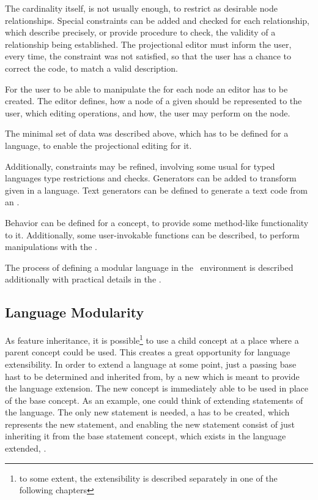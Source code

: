 The cardinality itself, is not usually enough, to restrict as desirable node relationships. Special constraints can be added and checked for 
each relationship, which describe precisely, or provide procedure to check, the validity of a relationship being established. The projectional editor
must inform the user, every time, the constraint was not satisfied, so that the user has a chance to correct the code, to match a valid  description.

For the user to be able to manipulate the  for each node  an editor has to be created. The editor defines, how a node of a given 
should be represented to the user, which editing operations, and how, the user may perform on the node.

The minimal set of data was described above, which has to be defined for a language, to enable the projectional editing for it.

Additionally, constraints may be refined, involving some usual for typed languages type restrictions and checks. Generators can be added to 
transform  given in a language. Text generators can be defined to generate a text code from an .

Behavior can be defined for a concept, to provide some method-like functionality to it. Additionally, some user-invokable functions can be described, to
perform manipulations with the .

The process of defining a modular language in the \jbmps\ environment is described additionally with practical details in the .

\subsection{Language Modularity}
\label{modularity}

As  feature inheritance, it is possible\footnote{to some extent, the extensibility is described separately in one of the following chapters} 
to use a child concept at a place where a parent concept could be used. This creates a great opportunity for language extensibility. In order to 
extend a language at some point, just a passing base  hast to be determined and inherited from, by a new  which is meant
to provide the language extension. The new concept is immediately able to be used in place of the base concept. As an example, one could think 
of extending statements of the language. The only new statement is needed, a  has to be created, which represents the new statement, 
and enabling the new statement consist of just inheriting it from the base statement concept, which exists in the language extended, .

